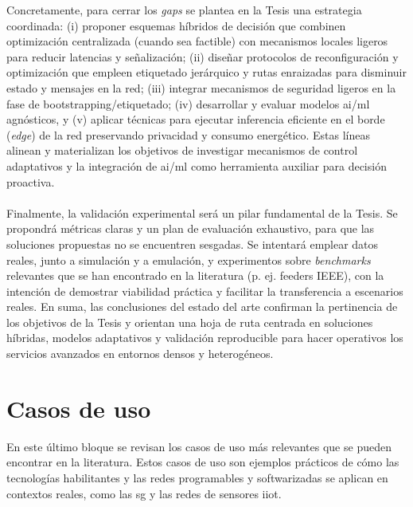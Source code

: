 Concretamente, para cerrar los \emph{gaps} se plantea en la Tesis una estrategia coordinada: (i) proponer esquemas híbridos de decisión que combinen optimización centralizada (cuando sea factible) con mecanismos locales ligeros para reducir latencias y señalización; (ii) diseñar protocolos de reconfiguración y optimización que empleen etiquetado jerárquico y rutas enraizadas para disminuir estado y mensajes en la red; (iii) integrar mecanismos de seguridad ligeros en la fase de bootstrapping/etiquetado; (iv) desarrollar y evaluar modelos \gls{ai}/\gls{ml} agnósticos, y (v) aplicar técnicas para ejecutar inferencia eficiente en el borde (\textit{edge}) de la red preservando privacidad y consumo energético. Estas líneas alinean y materializan los objetivos de investigar mecanismos de control adaptativos y la integración de \gls{ai}/\gls{ml} como herramienta auxiliar para decisión proactiva.\\
\\
Finalmente, la validación experimental será un pilar fundamental de la Tesis. Se propondrá métricas claras y un plan de evaluación exhaustivo, para que las soluciones propuestas no se encuentren sesgadas. Se intentará emplear datos reales, junto a simulación y a  emulación, y experimentos sobre \textit{benchmarks} relevantes que se han encontrado en la literatura (p. ej. feeders IEEE), con la intención de demostrar viabilidad práctica y facilitar la transferencia a escenarios reales. En suma, las conclusiones del estado del arte confirman la pertinencia de los objetivos de la Tesis y orientan una hoja de ruta centrada en soluciones híbridas, modelos adaptativos y validación reproducible para hacer operativos los servicios avanzados en entornos densos y heterogéneos.




\section{Casos de uso}  
\label{sec:casos_de_uso}

En este último bloque se revisan los casos de uso más relevantes que se pueden encontrar en la literatura. Estos casos de uso son ejemplos prácticos de cómo las tecnologías habilitantes y las redes programables y softwarizadas se aplican en contextos reales, como las \gls{sg} y las redes de sensores \gls{iiot}. 